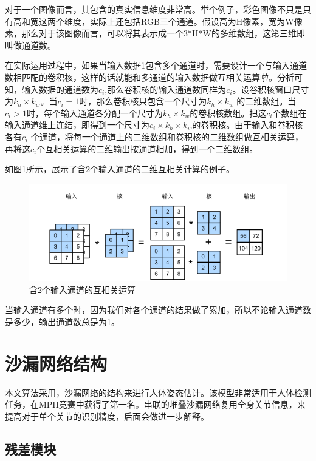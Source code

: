 对于一个图像而言，其包含的真实信息维度非常高。举个例子，彩色图像不只是只有高和宽这两个维度，实际上还包括RGB三个通道。假设高为H像素，宽为W像素，那么对于该图像而言，可以将其表示成一个3*H*W的多维数组，这第三维即叫做通道数。

在实际运用过程中，如果当输入数据1包含多个通道时，需要设计一个与输入通道数相匹配的卷积核，这样的话就能和多通道的输入数据做互相关运算啦。分析可知，输入数据的通道数为$c_i$,那么卷积核的输入通道数同样为$c_i$。设卷积核窗口尺寸为${k_h} \times {k_w}$。当${c_i} = 1$时，那么卷积核只包含一个尺寸为${k_h} \times {k_w}$	
 的二维数组。当${c_i} > 1$时，每个输入通道各分配一个尺寸为${k_h} \times {k_w}$的卷积核数组。把这$c_i$个数组在输入通道维上连结，即得到一个尺寸为${c_i} \times {k_h} \times {k_w}$的卷积核。由于输入和卷积核各有$c_i$	
 个通道，将每一个通道上的二维数组和卷积核的二维数组做互相关运算，再将这$c_i$个互相关运算的二维输出按通道相加，得到一个二维数组。
 
如图\ref{2_chan_input}所示，展示了含2个输入通道的二维互相关计算的例子。

\begin{figure}[h]
	\includegraphics[width=\textwidth]{pic/2_chan_input.png}
	\caption{含2个输入通道的互相关运算}
	\label{2_chan_input}
\end{figure}

当输入通道有多个时，因为我们对各个通道的结果做了累加，所以不论输入通道数是多少，输出通道数总是为1。

\section{沙漏网络结构}

本文算法采用，沙漏网络的结构来进行人体姿态估计。该模型非常适用于人体检测任务，在MPII竞赛中获得了第一名。串联的堆叠沙漏网络复用全身关节信息，来提高对于单个关节的识别精度，后面会做进一步解释。

\subsection{残差模块}


